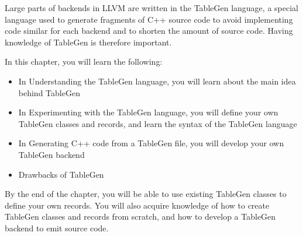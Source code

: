 Large parts of backends in LLVM are written in the TableGen language, a special language used to generate fragments of C++ source code to avoid implementing code similar for each backend and to shorten the amount of source code. Having knowledge of TableGen is therefore important.

In this chapter, you will learn the following:

\begin{itemize}
\item
In Understanding the TableGen language, you will learn about the main idea behind TableGen

\item
In Experimenting with the TableGen language, you will define your own TableGen classes and records, and learn the syntax of the TableGen language

\item
In Generating C++ code from a TableGen file, you will develop your own TableGen backend

\item
Drawbacks of TableGen
\end{itemize}

By the end of the chapter, you will be able to use existing TableGen classes to define your own records. You will also acquire knowledge of how to create TableGen classes and records from scratch, and how to develop a TableGen backend to emit source code.














